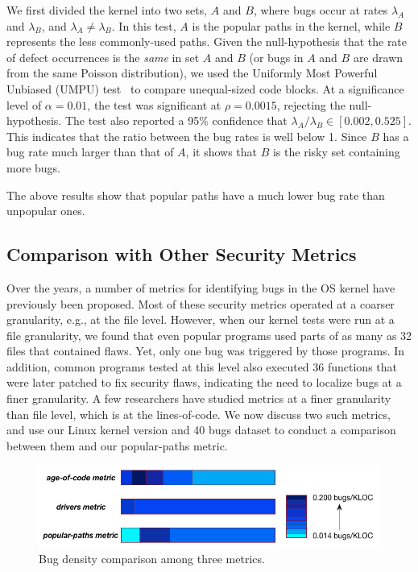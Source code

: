 We first divided the kernel into two sets,
$A$ and $B$, where bugs occur at rates $\lambda_A$ and
$\lambda_B$, and $\lambda_A \neq \lambda_B$. In this test, $A$ is the popular
paths in the kernel, while $B$
represents the less commonly-used paths. Given the null-hypothesis
that the rate of defect occurrences is the \textit{same} in set $A$ and $B$
(or bugs in $A$ and $B$ are drawn from the same Poisson distribution),
we used the Uniformly Most Powerful Unbiased (UMPU) test~\cite{shiue1982experiment}
to compare unequal-sized code blocks.
At a significance level of $\alpha=0.01$, the test was significant at
$\rho=0.0015$, rejecting the null-hypothesis.
The test also reported a 95\% confidence that $\lambda_A / \lambda_B
\in [0.002, 0.525]$. This indicates that the ratio between the bug rates is well
below 1. Since $B$ has a bug rate much larger than that of $A$, it shows 
that $B$ is the risky set containing more bugs. 


The above results show that
popular paths have a much lower bug rate than unpopular ones.

\subsection{Comparison with Other Security Metrics}

Over the years, a number of metrics for identifying bugs in the OS kernel have
previously been proposed. Most of these security metrics operated at a coarser granularity,
e.g., at the file level. However, when our kernel tests were run at a file
granularity, we found that even popular programs used parts of as many as
32 files that contained flaws. Yet, only one bug was triggered by those programs.
In addition, common programs tested at this level also executed 36 functions
that were later patched to fix security
flaws, indicating the need to localize bugs at a finer granularity.
A few researchers have studied metrics at a finer granularity than file level, which
is at the lines-of-code.
We now discuss two such metrics, and use our Linux kernel version and 40 bugs dataset
to conduct a comparison between them and our popular-paths metric.

\begin{figure}
\centering
\includegraphics[width=1.2\columnwidth]{diagram/bug_density.png}
\caption{\small Bug density comparison among three metrics.}
\label{fig:bug_density}
\end{figure}

